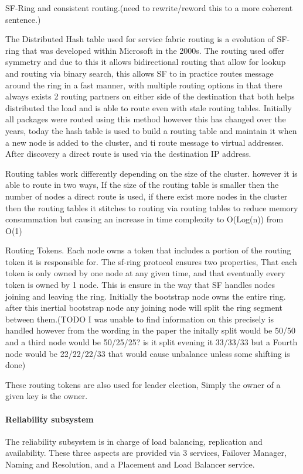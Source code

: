 \documentclass[a4paper,10pt,titlepage]{report}
\begin{document}
SF-Ring and consistent routing.(need to rewrite/reword this to a more coherent sentence.)

The Distributed Hash table used for service fabric routing is a evolution of SF-ring that was developed within Microsoft in the 2000s. The routing used offer symmetry and due to this it allows bidirectional routing that allow for lookup and routing via binary search, this allows SF to in practice routes message around the ring in a fast manner, with multiple routing options in that there always exists 2 routing partners on either side of the destination that both helps distributed the load and is able to route even with stale routing tables. Initially all packages were routed using this method however this has changed over the years, today the hash table is used to build a routing table and maintain it when a new node is added to the cluster, and ti route message to virtual addresses. After discovery a direct route is used via the destination IP address. 

Routing tables work differently depending on the size of the cluster. however it is able to route in two ways, If the size of the routing table is smaller then the number of nodes a direct route is used, if there exist more nodes in the cluster then the routing tables it stitches to routing via routing tables to reduce memory consummation but causing an increase in time complexity to O(Log(n)) from O(1)

Routing Tokens.
Each node owns a token that includes a portion of the routing token it is responsible for. The sf-ring protocol ensures two properties, That each token is only owned by one node at any given time, and that eventually every token is owned by 1 node. This is ensure in the way that SF handles nodes joining and leaving the ring. Initially the bootstrap node owns the entire ring. after this inertial bootstrap node any joining node will split the ring segment between them.(TODO I was unable to find information on this precisely is handled however from the wording in the paper the initally split would be 50/50 and a third node would be 50/25/25?  is it split evening it 33/33/33 but a Fourth node would be 22/22/22/33 that would cause unbalance unless some shifting is done)


These routing tokens are also used for leader election, Simply the owner of a given key is the owner.

\paragraph{Reliability subsystem}
The reliability subsystem is in charge of load balancing, replication and availability. These three aspects are provided via 3 services, Failover Manager, Naming and Resolution, and a Placement and Load Balancer service.
\end{document}
